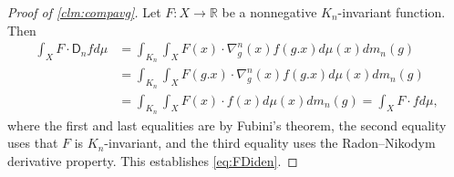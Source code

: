 \documentclass{amsart}
\numberwithin{equation}{subsection}
\theoremstyle{plain}
\theoremstyle{definition}
\theoremstyle{plain}
\begin{document}
\begin{proof}[Proof of \cref{clm:compavg}]
Let \(F:X\to\mathbb{R}\) be a nonnegative \(K_{n}\)-invariant function. Then
\begin{align*}
\int_{X}F\cdot\mathsf{D}_{n}fd\mu	
&=\int_{K_{n}}\int_{X}F\left(x\right)\cdot\nabla_{g}^{n}\left(x\right)f\left(g.x\right)d\mu\left(x\right)dm_{n}\left(g\right)\\
&=\int_{K_{n}}\int_{X}F\left(g.x\right)\cdot\nabla_{g}^{n}\left(x\right)f\left(g.x\right)d\mu\left(x\right)dm_{n}\left(g\right)\\
&=\int_{K_{n}}\int_{X}F\left(x\right)\cdot f\left(x\right)d\mu\left(x\right)dm_{n}\left(g\right)=\int_{X}F\cdot fd\mu,
\end{align*}
where the first and last equalities are by Fubini's theorem, the second equality uses that \(F\) is \(K_{n}\)-invariant, and the third equality uses the Radon--Nikodym derivative property. This establishes \eqref{eq:FDiden}.

\smallskip


\end{proof}
\end{document}
